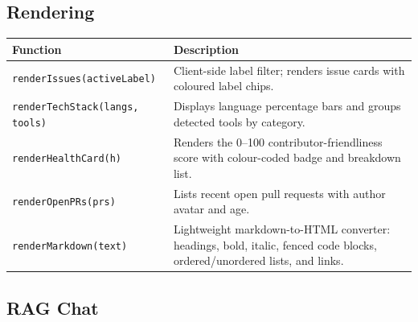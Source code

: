 \documentclass[11pt,a4paper]{article}
\begin{document}
\subsection{Rendering}

\begin{longtable}{L{5.2cm} L{8.3cm}}
    \toprule
    \textbf{Function} & \textbf{Description} \\
    \midrule
    \endhead
    \bottomrule
    \endfoot

    \texttt{renderIssues(activeLabel)} &
        Client-side label filter; renders issue cards with coloured label chips. \\
    \addlinespace

    \texttt{renderTechStack(langs, tools)} &
        Displays language percentage bars and groups detected tools by category. \\
    \addlinespace

    \texttt{renderHealthCard(h)} &
        Renders the 0--100 contributor-friendliness score with colour-coded badge and breakdown list. \\
    \addlinespace

    \texttt{renderOpenPRs(prs)} &
        Lists recent open pull requests with author avatar and age. \\
    \addlinespace

    \texttt{renderMarkdown(text)} &
        Lightweight markdown-to-HTML converter: headings, bold, italic, fenced code blocks, ordered/unordered lists, and links. \\
\end{longtable}

\subsection{RAG Chat}
\end{document}
